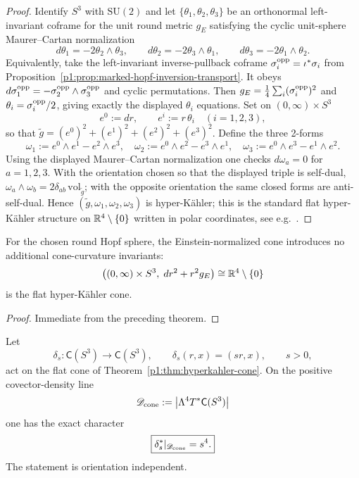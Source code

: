 \documentclass[11pt]{article}
\begin{document}
\begin{proof}
Identify $S^3$ with $\mathrm{SU}(2)$ and let $\{\theta_1,\theta_2,\theta_3\}$ be an orthonormal left-invariant coframe for the unit round metric $g_E$ satisfying the cyclic unit-sphere Maurer--Cartan normalization
\[
d\theta_1=-2\theta_2\wedge\theta_3,\qquad
d\theta_2=-2\theta_3\wedge\theta_1,\qquad
d\theta_3=-2\theta_1\wedge\theta_2.
\]
Equivalently, take the left-invariant inverse-pullback coframe
$\sigma_i^{\rm opp}=\iota^*\sigma_i$ from
Proposition~\ref{p1:prop:marked-hopf-inversion-transport}.  It obeys
$d\sigma_1^{\rm opp}=-\sigma_2^{\rm opp}\wedge\sigma_3^{\rm opp}$
and cyclic permutations.  Then
$g_E=\frac14\sum_i(\sigma_i^{\rm opp})^2$ and
$\theta_i=\sigma_i^{\rm opp}/2$, giving exactly the displayed
$\theta_i$ equations.  Set on $(0,\infty)\times S^3$
\[
e^0:=dr,\qquad e^i:=r\,\theta_i\quad(i=1,2,3),
\]
so that $\tilde g=(e^0)^2+(e^1)^2+(e^2)^2+(e^3)^2$.
Define the three 2-forms
\[
\omega_1:=e^0\wedge e^1-e^2\wedge e^3,\quad
\omega_2:=e^0\wedge e^2-e^3\wedge e^1,\quad
\omega_3:=e^0\wedge e^3-e^1\wedge e^2.
\]
Using the displayed Maurer--Cartan normalization one checks $d\omega_a=0$ for $a=1,2,3$. With the orientation chosen so that the displayed triple is self-dual, $\omega_a\wedge\omega_b=2\delta_{ab}\,\mathrm{vol}_{\tilde g}$; with the opposite orientation the same closed forms are anti-self-dual. Hence $(\tilde g,\omega_1,\omega_2,\omega_3)$ is hyper-Kähler; this is the standard flat hyper-Kähler structure on $\mathbb{R}^4\setminus\{0\}$ written in polar coordinates, see e.g.\ \cite{boyer2008sasakian,besse1978manifolds}.
\end{proof}

\begin{corollary}
\label{p1:cor:flat-cone-canonical-scale}
For the chosen round Hopf sphere, the Einstein-normalized cone introduces no additional cone-curvature invariants:
\[
\bigl((0,\infty)\times S^3,\;dr^2+r^2 g_E\bigr)
\cong \mathbb{R}^4\setminus\{0\}
\]
is the flat hyper-K\"ahler cone.
\end{corollary}

\begin{proof}
Immediate from the preceding theorem.
\end{proof}

\begin{corollary}
\label{p1:cor:flat-cone-four-density-homothety}
Let
\[
 \delta_s:\mathsf C(S^3)\longrightarrow\mathsf C(S^3),
 \qquad \delta_s(r,x)=(sr,x),\qquad s>0,
\]
act on the flat cone of
Theorem~\ref{p1:thm:hyperkahler-cone}.  On the positive covector-density
line
\[
 \mathscr D_{\rm cone}:=
 \left|\Lambda^4T^*\mathsf C(S^3)\right|
\]
one has the exact character
\[
 \boxed{\delta_s^*|_{\mathscr D_{\rm cone}}=s^4.}
\]
The statement is orientation independent.
\end{corollary}
\end{document}
